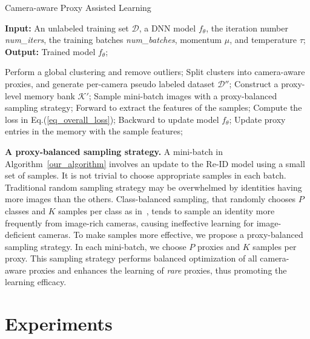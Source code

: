 \documentclass[letterpaper]{article} %
\begin{document}
\begin{algorithm}[h]{
\caption{Camera-aware Proxy Assisted Learning}
\label{our_algorithm}
\hspace*{0.02in} {\bf Input:}
An unlabeled training set $\mathcal{D}$, a DNN model $f_{\theta}$, the iteration number \textit{num\_iters}, the training batches \textit{num\_batches}, momentum $\mu$, and temperature $\tau$; \\
\hspace*{0.02in} {\bf Output:}
Trained model $f_{\theta}$;
\begin{algorithmic}[1]
    \State Perform a global clustering and remove outliers;
    \State Split clusters into camera-aware proxies, and generate per-camera pseudo labeled dataset $\mathcal{D}''$;
		\State Construct a proxy-level memory bank $\mathcal{K}'$;
        \State Sample mini-batch images with a proxy-balanced sampling strategy;
        \State Forward to extract the features of the samples;
        \State Compute the loss in Eq.(\ref{eq_overall_loss});
        \State Backward to update model $f_{\theta}$;
        \State Update proxy entries in the memory with the sample features;
    \EndFor
\EndFor
\end{algorithmic}
}
\end{algorithm}

\textbf{A proxy-balanced sampling strategy.} A mini-batch in Algorithm~\ref{our_algorithm} involves an update to the Re-ID model using a small set of samples. It is not trivial to choose appropriate samples in each batch. Traditional random sampling strategy may be overwhelmed by identities having more images than the others. Class-balanced sampling, that randomly chooses $P$ classes and $K$ samples per class as in~\cite{hermans2017defense}, tends to sample an identity more frequently from image-rich cameras, causing ineffective learning for image-deficient cameras. To make samples more effective, we propose a proxy-balanced sampling strategy. In each mini-batch, we choose $P$ proxies and $K$ samples per proxy. This sampling strategy performs balanced optimization of all camera-aware proxies and enhances the learning of \textit{rare} proxies, thus promoting the learning efficacy.



\section{Experiments}
\end{document}
